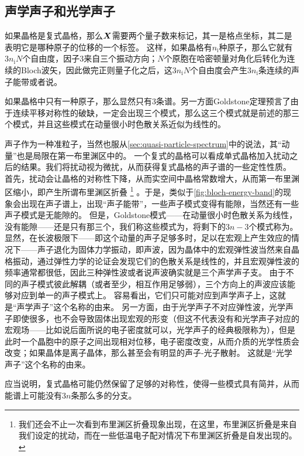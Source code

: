 \subsection{声学声子和光学声子}

如果晶格是复式晶格，那么$\vb*{X}$需要两个量子数来标记，其一是格点坐标，其二是表明它是哪种原子的位移的一个标签。
这样，如果晶格有$n_\text{i}$种原子，那么它就有$3n_\text{i} N$个自由度，因子$3$来自三个振动方向；$N$个原胞在哈密顿量对角化后转化为连续的Bloch波矢，因此做完正则量子化之后，这$3n_\text{i} N$个自由度会产生$3n_\text{i}$条连续的声子能带或者说。

如果晶格中只有一种原子，那么显然只有$3$条谱。另一方面Goldstone定理预言了由于连续平移对称性的破缺，一定会出现三个模式，那么这三个模式就是前述的那三个模式，并且这些模式在动量很小时色散关系近似为线性的。

声子作为一种准粒子，当然也服从\autoref{sec:quasi-particle-spectrum}中的说法，其“动量”也是局限在第一布里渊区中的。
一个复式的晶格可以看成单式晶格加入扰动之后的结果。我们将扰动视为微扰，从而获得复式晶格的声子谱的一些定性性质。
首先，扰动会让晶格的对称性下降，从而实空间中晶格常数增大，从而第一布里渊区缩小，即产生所谓布里渊区折叠%
\footnote{
    我们还会不止一次看到布里渊区折叠现象出现，在这里，布里渊区折叠是来自我们设定的扰动，而在一些低温电子配对情况下布里渊区折叠是自发出现的。
}%
。于是，类似于\autoref{fig:bloch-energy-band}的现象会出现在声子谱上，出现“声子能带”，一些声子模式变得有能隙，当然还有一些声子模式是无能隙的。
但是，Goldstone模式——在动量很小时色散关系为线性，没有能隙——还是只有那三个，我们称这些模式为，将剩下的$3n-3$个模式称为。
显然，在长波极限下——即这个动量的声子足够多时，足以在宏观上产生效应的情况下——声子退化为固体力学振动，即声波，因为晶体中的宏观弹性波当然来自晶格振动，通过弹性力学的论证会发现它们的色散关系是线性的，并且宏观弹性波的频率通常都很低，因此三种弹性波或者说声波确实就是三个声学声子支。
由于不同的声子模式彼此解耦（或者至少，相互作用足够弱），三个方向上的声波应该能够对应到单一的声子模式上。
容易看出，它们只可能对应到声学声子上，这就是“声学声子”这个名称的由来。
另一方面，由于光学声子不对应弹性波，光学声子即使很多，也不会导致固体出现宏观的形变（但这不代表没有和光学声子对应的宏观场——比如说后面所说的电子密度就可以，光学声子的经典极限称为），但是此时一个晶胞中的原子之间出现相对位移，电子密度改变，从而介质的光学性质会改变；如果晶体是离子晶体，那么甚至会有明显的声子-光子散射。
这就是“光学声子”这个名称的由来。

应当说明，复式晶格可能仍然保留了足够的对称性，使得一些模式具有简并，从而能谱上可能没有$3n$条那么多的分支。

